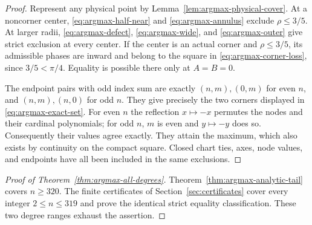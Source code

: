 \begin{proof}
Represent any physical point by Lemma~\ref{lem:argmax-physical-cover}.
At a noncorner center, \eqref{eq:argmax-half-near} and
\eqref{eq:argmax-annulus} exclude $\rho\leq3/5$.  At larger radii,
\eqref{eq:argmax-defect}, \eqref{eq:argmax-wide}, and
\eqref{eq:argmax-outer} give strict exclusion at every center.  If the
center is an actual corner and $\rho\leq3/5$, its admissible phases are
inward and belong to the square in \eqref{eq:argmax-corner-loss}, since
$3/5<\pi/4$.  Equality is possible there only at $A=B=0$.

The endpoint pairs with odd index sum are exactly $(n,m),(0,m)$ for
even $n$, and $(n,m),(n,0)$ for odd $n$.  They give precisely the two
corners displayed in \eqref{eq:argmax-exact-set}.  For even $n$ the
reflection $x\mapsto-x$ permutes the nodes and their cardinal
polynomials; for odd $n$, $m$ is even and $y\mapsto-y$ does so.
Consequently their values agree exactly.  They attain the maximum,
which also exists by continuity on the compact square.  Closed chart
ties, axes, node values, and endpoints have all been included in the
same exclusions.
\end{proof}

\begin{proof}[Proof of Theorem~\ref{thm:argmax-all-degrees}]
Theorem~\ref{thm:argmax-analytic-tail} covers $n\geq320$.
The finite certificates of Section~\ref{sec:certificates} cover every
integer $2\leq n\leq319$ and prove the identical strict equality
classification.  These two degree ranges exhaust the assertion.
\end{proof}
